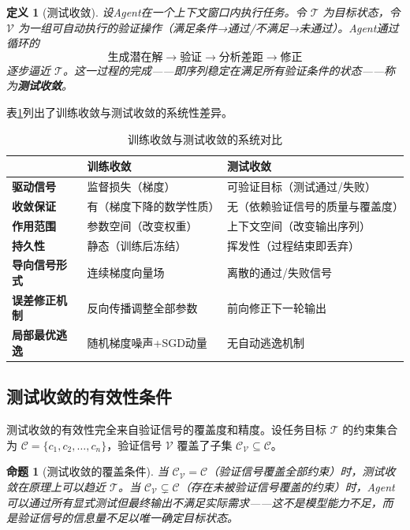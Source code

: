 \documentclass[11pt,a4paper]{ctexart}
\newtheorem{proposition}[theorem]{命题}
\newtheorem{definition}[theorem]{定义}
\begin{document}
\begin{definition}[测试收敛]
    设Agent在一个上下文窗口内执行任务。令 $\mathcal{T}$ 为目标状态，令 $\mathcal{V}$ 为一组可自动执行的验证操作（满足条件→通过/不满足→未通过）。Agent通过循环的
    \[
    \text{生成潜在解} \longrightarrow \text{验证} \longrightarrow \text{分析差距} \longrightarrow \text{修正}
    \]
    逐步逼近 $\mathcal{T}$。这一过程的完成——即序列稳定在满足所有验证条件的状态——称为\textbf{测试收敛}。
\end{definition}

表\ref{tab:convergence_comparison}列出了训练收敛与测试收敛的系统性差异。

\begin{table}[htbp]
\centering
\caption{训练收敛与测试收敛的系统对比}
\label{tab:convergence_comparison}
\begin{tabular}{@{}p{3cm}ll@{}}
\toprule
& \textbf{训练收敛} & \textbf{测试收敛} \\
\midrule
\textbf{驱动信号}      & 监督损失（梯度）            & 可验证目标（测试通过/失败） \\
\textbf{收敛保证}      & 有（梯度下降的数学性质）     & 无（依赖验证信号的质量与覆盖度） \\
\textbf{作用范围}      & 参数空间（改变权重）         & 上下文空间（改变输出序列） \\
\textbf{持久性}        & 静态（训练后冻结）          & 挥发性（过程结束即丢弃） \\
\textbf{导向信号形式}  & 连续梯度向量场              & 离散的通过/失败信号 \\
\textbf{误差修正机制}  & 反向传播调整全部参数        & 前向修正下一轮输出 \\
\textbf{局部最优逃逸}  & 随机梯度噪声+SGD动量       & 无自动逃逸机制 \\
\bottomrule
\end{tabular}
\end{table}

\subsection{测试收敛的有效性条件}

测试收敛的有效性完全来自验证信号的覆盖度和精度。设任务目标 $\mathcal{T}$ 的约束集合为 $\mathcal{C} = \{c_1, c_2, \dots, c_n\}$，验证信号 $\mathcal{V}$ 覆盖了子集 $\mathcal{C}_{\mathcal{V}} \subseteq \mathcal{C}$。

\begin{proposition}[测试收敛的覆盖条件]
    当 $\mathcal{C}_{\mathcal{V}} = \mathcal{C}$（验证信号覆盖全部约束）时，测试收敛在原理上可以趋近 $\mathcal{T}$。当 $\mathcal{C}_{\mathcal{V}} \subsetneq \mathcal{C}$（存在未被验证信号覆盖的约束）时，Agent可以通过所有显式测试但最终输出不满足实际需求——这不是模型能力不足，而是验证信号的信息量不足以唯一确定目标状态。
\end{proposition}
\end{document}
